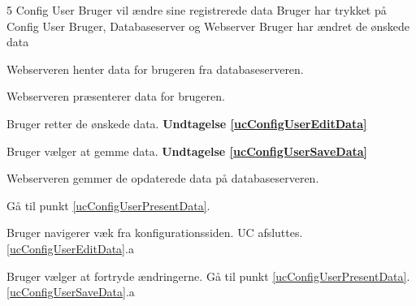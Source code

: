 \uchead
	{5} %
	{Config User} %
	{Bruger vil ændre sine registrerede data} %
	{Bruger har trykket på Config User} %
	{Bruger, Databaseserver og Webserver} %
	{} %
	{} %
	{Bruger har ændret de ønskede data} %


\item\label{ucConfigUserPresentData} Webserveren henter data for brugeren fra databaseserveren.

\item Webserveren præsenterer data for brugeren.

\item\label{ucConfigUserEditData} Bruger retter de ønskede data. \textbf{Undtagelse \ref{ucConfigUserEditData}}

\item\label{ucConfigUserSaveData} Bruger vælger at gemme data. \textbf{Undtagelse \ref{ucConfigUserSaveData}}

\item Webserveren gemmer de opdaterede data på databaseserveren.

\item Gå til punkt \ref{ucConfigUserPresentData}.


\ucdescriptionend %

\ucextension
	{Bruger navigerer væk fra konfigurationssiden.}
	{UC afsluttes.}
	{\ref{ucConfigUserEditData}.a}

\ucextension
	{Bruger vælger at fortryde ændringerne.}
	{Gå til punkt \ref{ucConfigUserPresentData}.}
	{\ref{ucConfigUserSaveData}.a}

